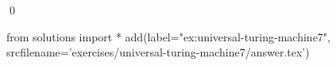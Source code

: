 
\begin{ex} 
  \label{ex:universal-turing-machine7}
  
  \qed
\end{ex} 
\begin{python0}
from solutions import *
add(label="ex:universal-turing-machine7",
    srcfilename='exercises/universal-turing-machine7/answer.tex') 
\end{python0}
